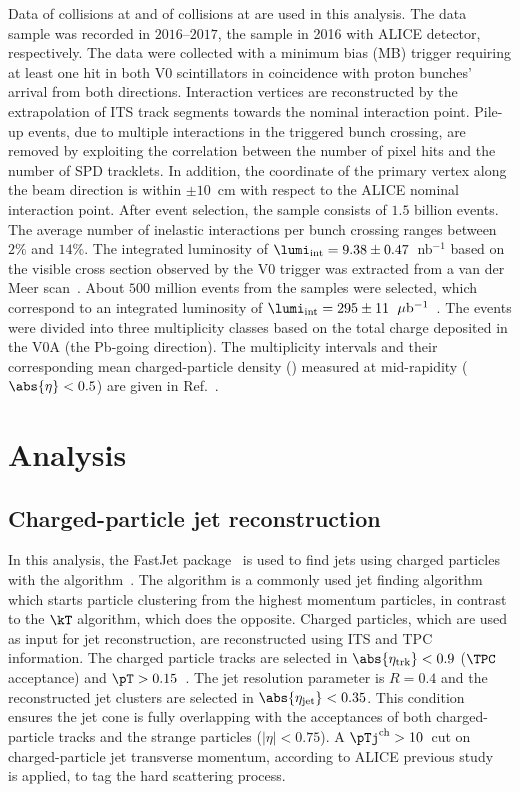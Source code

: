 \documentclass[ALICE,manyauthors]{cernphprep}
\begin{document}
Data of \pp collisions at \thirteen and of \pPb collisions at \fivenn are used in this analysis.
The \pp data sample was recorded in $2016$--$2017$, the \pPb sample in 2016 with ALICE detector, respectively.
The data were collected with a minimum bias (MB) trigger requiring at least one hit in both V0 scintillators in coincidence with proton bunches' arrival from both directions.
Interaction vertices are reconstructed by the extrapolation of ITS track segments towards the nominal interaction point.
Pile-up events, due to multiple interactions in the triggered bunch crossing, are removed by exploiting the correlation between the number of pixel hits and the number of SPD tracklets.
In addition, the coordinate of the primary vertex along the beam direction is within $\pm 10$~cm with respect to the ALICE nominal interaction point.
After event selection, the \pp sample consists of $1.5$ billion events.
The average number of inelastic interactions per bunch crossing ranges between $2\%$ and $14\%$.
The integrated luminosity of $\lumi_{\rm int} = 9.38\pm 0.47$~nb$^{-1}$ based on the visible cross section observed by the V0 trigger was extracted from a van der Meer scan~\cite{ALICE-PUBLIC-2016-002}.
About $500$ million events from the \pPb samples were selected, which correspond to an integrated luminosity of $\lumi_{\rm int} = 295 \pm 11 $~$\mu{\rm b}^{-1}$~\cite{ALICE:2019oyn}.
The \pPb events were divided into three multiplicity classes based on the total charge deposited in the V0A (the Pb-going direction).
The multiplicity intervals and their corresponding mean charged-particle density (\dndeta) measured at mid-rapidity ($\abs{\eta} < 0.5$) are given in Ref.~\cite{Adam:2015pza}. 

\section{Analysis}%
\label{sec:Analysis}

\subsection{Charged-particle jet reconstruction}%
\label{sec:JetRec}

In this analysis, the FastJet package~\cite{Cacciari:2011ma} is used to find jets using charged particles with the \akT algorithm~\cite{Cacciari:2008gp}.
The \akT algorithm is a commonly used jet finding algorithm which starts particle clustering from the highest momentum particles, in contrast to the $\kT$ algorithm, which does the opposite.
Charged particles, which are used as input for jet reconstruction, are reconstructed using ITS and TPC information.
The charged particle tracks are selected in $\abs{\eta_{\rm trk}} < 0.9$ ($\TPC$ acceptance) and $\pT> 0.15$~\GeVc.
The jet resolution parameter is $R = 0.4$ and the reconstructed jet clusters are selected in $\abs{\eta_{\rm jet}} < 0.35$.
This condition ensures the jet cone is fully overlapping with the acceptances of both charged-particle tracks and the strange particles ($|\eta| < 0.75$).
A $\pTj^{\rm ch} > 10$~\GeVc cut on charged-particle jet transverse momentum, according to ALICE previous study~\cite{Acharya:2021oaa} is applied, to tag the hard scattering process.
\end{document}

